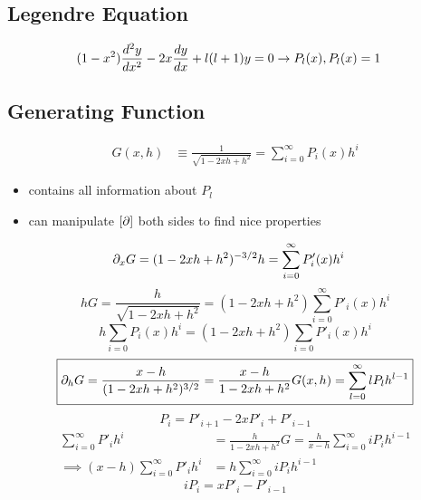 \documentclass[Maths.tex]{subfiles}
\begin{document}
\chapter{}
\section{Legendre Equation}
\begin{align}
    (1-x^2)\frac{d^2 y}{dx^2} &- 2x\frac{dy}{dx} + l(l+1)y = 0 \to P_l(x), P_l(x) = 1
\end{align}
\section{Generating Function}
\begin{align}
    G(x,h) &\equiv \frac{1}{\sqrt{1-2xh+h^2}} = \sum_{i=0}^\infty P_i(x)h^i
\end{align}
\begin{itemize}
    \item contains all information about $P_l$
    \item can manipulate $[\partial]$ both sides to find nice properties
\end{itemize}
\begin{align}
    \partial_xG &= (1-2xh+h^2)^{-3/2}h = \sum_{i=0}^\infty P'_i(x)h^i
\end{align}
\begin{equation}
    \boxed{hG = \frac{h}{\sqrt{1-2xh+h^2}} = (1-2xh+h^2)\sum_{i=0}^\infty P'_i(x)h^i}
\end{equation}
\begin{equation}
    \boxed{h\sum_{i=0} P_i(x)h^i = (1-2xh+h^2)\sum_{i=0}P'_i(x)h^i}
\end{equation}
\begin{equation}
    \boxed{\partial_hG = \frac{x-h}{(1-2xh+h^2)^{3/2}} = \frac{x-h}{1-2xh+h^2}G(x,h) = \sum_{l=0}^\infty lP_lh^{l-1}}
\end{equation}
\begin{equation}
    \boxed{P_i = P'_{i+1} - 2xP'_i + P'_{i-1}}
\end{equation}
\begin{align}
    \sum_{i=0}^\infty P'_ih^i &= \frac{h}{1-2xh+h^2}G = \frac{h}{x-h}\sum_{i=0}^\infty iP_ih^{i-1} \\
    \implies (x-h)\sum_{i=0}^\infty P'_ih^i &= h\sum_{i=0}^\infty iP_ih^{i-1}
\end{align}
\begin{equation}
    \boxed{iP_i = xP'_i - P'_{i-1}}
\end{equation}
\end{document}
